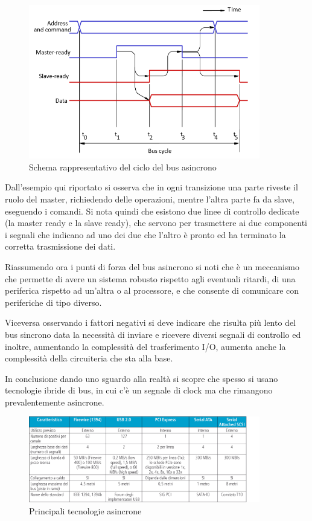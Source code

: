 \documentclass[class=book, crop=false, oneside]{standalone}
\begin{document}
\begin{figure}[H]
	\centering
	\includegraphics[width=0.9\textwidth,keepaspectratio]{bus-asincrono}
	\caption{Schema rappresentativo del ciclo del bus asincrono}
\end{figure}

Dall'esempio qui riportato si osserva che in ogni transizione una parte riveste il ruolo del master, richiedendo delle operazioni, mentre l'altra parte fa da slave, eseguendo i comandi.
Si nota quindi che esistono due linee di controllo dedicate (la master ready e la slave ready), che servono per trasmettere ai due componenti i segnali che indicano ad uno dei due che l'altro è pronto ed ha terminato la corretta trasmissione dei dati.

Riassumendo ora i punti di forza del bus asincrono si noti che è un meccanismo che permette di avere un sistema robusto rispetto agli eventuali ritardi, di una periferica rispetto ad un'altra o al processore, e che consente di comunicare con periferiche di tipo diverso.

Viceversa osservando i fattori negativi si deve indicare che risulta più lento del bus sincrono data la necessità di inviare e ricevere diversi segnali di controllo ed inoltre, aumentando la complessità del trasferimento I/O, aumenta anche la complessità della circuiteria che sta alla base.

In conclusione dando uno sguardo alla realtà si scopre che spesso si usano tecnologie ibride di bus, in cui c’è un segnale di clock ma che rimangono prevalentemente asincrone.

\begin{figure}[H]
	\centering
	\includegraphics[width=0.9\textwidth,keepaspectratio]{tecnologie-asincrone}
	\caption{Principali tecnologie asincrone}
\end{figure}
\end{document}
